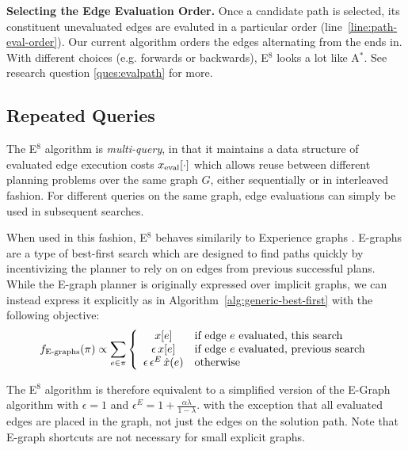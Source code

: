 \textbf{Selecting the Edge Evaluation Order.}
\label{subsec:alg-path-evaluation}
Once a candidate path is selected,
its constituent unevaluated edges are evaluted
in a particular order (line~\ref{line:path-eval-order}).
Our current algorithm
orders the edges alternating from the ends in.
With different choices (e.g. forwards or backwards),
E$^8$ looks a lot like A$^*$.
See research question \ref{ques:evalpath}
for more.

\subsection{Repeated Queries}

The E$^8$ algorithm is \emph{multi-query},
in that it maintains a data structure of evaluated edge
execution costs $x_{\mbox{\scriptsize eval}}[\cdot]$
which allows reuse between different planning problems
over the same graph $G$,
either sequentially or in interleaved fashion.
For different queries on the same graph,
edge evaluations can simply be used in subsequent searches.

When used in this fashion,
E$^8$ behaves similarily to Experience graphs
\cite{phillips2012egraphs}.
E-graphs are a type of best-first search which
are designed to find paths quickly by incentivizing the planner
to rely on on edges from previous successful plans.
While the E-graph planner is originally expressed over implicit graphs,
we can instead express it explicitly
as in Algorithm~\ref{alg:generic-best-first}
with the following objective:
\begin{equation}
   f_{\mbox{\scriptsize E-graphs}}(\pi) \propto \sum_{e \in \pi} \left\{
   \begin{array}{cl}
      x[e] & \mbox{if edge } e \mbox{ evaluated, this search} \\
      \epsilon \, x[e] & \mbox{if edge } e \mbox{ evaluated, previous search} \\
     \epsilon \, \epsilon^E \, \hat{x}(e) & \mbox{otherwise} \\
   \end{array}
   \right.
\end{equation}

The E$^8$ algorithm
is therefore equivalent to a simplified version of the E-Graph algorithm
with $\epsilon=1$ and $\epsilon^E = 1 + \frac{\alpha \lambda}{1-\lambda}$.
with the exception that all evaluated edges are placed in the graph,
not just the edges on the solution path.
Note that E-graph shortcuts
are not necessary for small explicit graphs.

